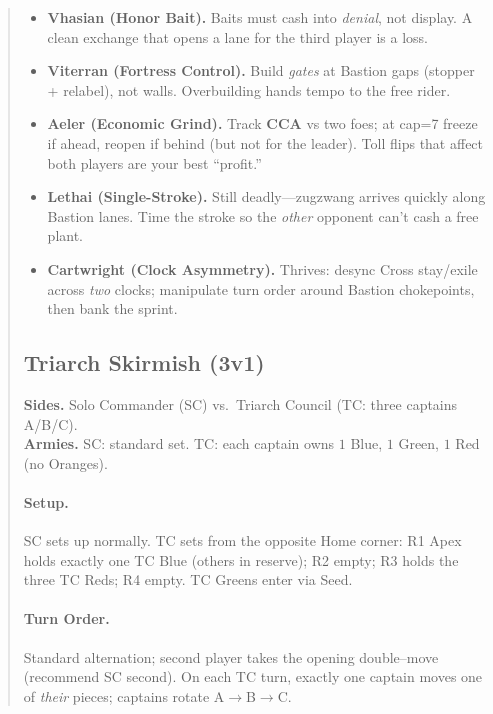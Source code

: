 \documentclass[11pt]{article}
\begin{document}
\begin{quote}
\begin{tcolorbox}[enhanced,breakable,title={Triad (3-Player, Bastion) — What Changes},
  colback=white,colframe=royal,boxrule=0.8pt]
\begin{itemize}[leftmargin=1.1em,itemsep=0.3em]
\item \textbf{Vhasian (Honor Bait).} Baits must cash into \emph{denial}, not display. A clean exchange that opens a lane for the third player is a loss.

\item \textbf{Viterran (Fortress Control).} Build \emph{gates} at Bastion gaps (stopper + relabel), not walls. Overbuilding hands tempo to the free rider.

\item \textbf{Aeler (Economic Grind).} Track \textbf{CCA} vs two foes; at cap=7 freeze if ahead, reopen if behind (but not for the leader). Toll flips that affect both players are your best “profit.”

\item \textbf{Lethai (Single-Stroke).} Still deadly—zugzwang arrives quickly along Bastion lanes. Time the stroke so the \emph{other} opponent can’t cash a free plant.

\item \textbf{Cartwright (Clock Asymmetry).} Thrives: desync Cross stay/exile across \emph{two} clocks; manipulate turn order around Bastion chokepoints, then bank the sprint.
\end{itemize}
\end{tcolorbox}

\clearpage

\subsection{Triarch Skirmish (3v1)}
\textbf{Sides.} Solo Commander (SC) vs.\ Triarch Council (TC: three captains A/B/C).\\
\textbf{Armies.} SC: standard set. TC: each captain owns $1$ Blue, $1$ Green, $1$ Red (no Oranges).

\paragraph{Setup.} SC sets up normally. TC sets from the opposite Home corner: R1 Apex holds exactly one TC Blue (others in reserve); R2 empty; R3 holds the three TC Reds; R4 empty. TC Greens enter via Seed.

\paragraph{Turn Order.} Standard alternation; second player takes the opening double--move (recommend SC second). On each TC turn, exactly one captain moves one of \emph{their} pieces; captains rotate A$\to$B$\to$C.


\end{quote}
\end{document}
